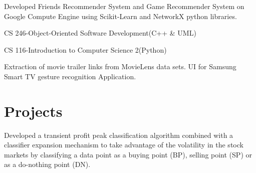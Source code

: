 \documentclass[]{Vishnu-Resume}
\begin{document}
\begin{minipage}[t]{0.66\textwidth}
\begin{tightemize}\item Developed Friends Recommender System and Game Recommender System on
Google Compute Engine using Scikit-Learn and NetworkX python libraries.
\end{tightemize}
\sectionsep

\begin{tightemize}\item CS 246-Object-Oriented Software Development(C++ \& UML)
\item CS 116-Introduction to Computer Science 2(Python)
\end{tightemize}
\sectionsep

\begin{tightemize}\item Extraction of movie trailer links from MovieLens data sets. UI for Samsung Smart TV gesture recognition Application.
\end{tightemize}
\sectionsep

\section{Projects}

Developed a transient profit peak classification algorithm combined with a classifier expansion
mechanism to take advantage of the volatility in the stock markets by classifying a data point as a
buying point (BP), selling point (SP) or as a do-nothing point (DN).
\sectionsep

\end{minipage} 
\end{document}
